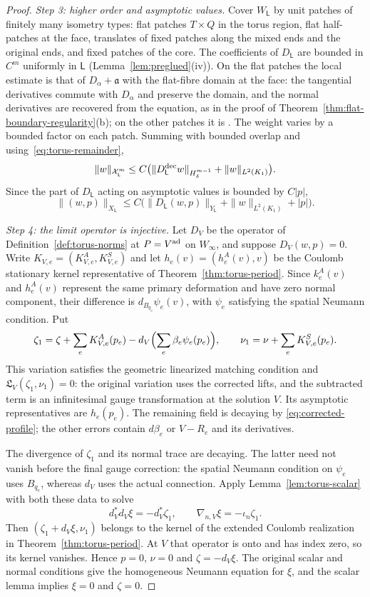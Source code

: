 \documentclass[11pt]{amsart}
\theoremstyle{definition}
\theoremstyle{remark}
\theoremstyle{plain}
\numberwithin{equation}{section}
\begin{document}
\begin{proof}
\emph{Step 3: higher order and asymptotic values.} Cover $W_\mathsf L$ by unit patches of finitely
many isometry types: flat patches $T\times Q$ in the torus region, flat half-patches at
the face, translates of fixed patches along the mixed ends and the original ends,
and fixed patches of the core. The coefficients of $D_\mathsf L$ are bounded in $C^m$
uniformly in $\mathsf L$ (Lemma~\ref{lem:preglued}(iv)). On the flat patches the local
estimate is that of $D_\alpha+\mathfrak a$ with the flat-fibre domain at the face: the
tangential derivatives commute with $D_\alpha$ and preserve the domain, and the
normal derivatives are recovered from the equation, as in the proof of
Theorem~\ref{thm:flat-boundary-regularity}(b); on the other patches it is
\cite[Theorem~4.17 and Remark~4.19]{DFL}. The weight varies by a bounded factor on
each patch. Summing with bounded overlap and using~\eqref{eq:torus-remainder},
\[
\|w\|_{\mathcal X^m_\mathsf L}\le C\bigl(\|D^{\rm dec}_{\mathsf L}w\|_{H^{m-1}_\delta}+\|w\|_{L^2(K_1)}\bigr).
\]
Since the part of $D_\mathsf L$ acting on asymptotic values is bounded by $C|p|$,
\begin{equation}\label{eq:torus-remainder-full}
\|(w,p)\|_{X_\mathsf L}\le C\bigl(\|D_{\mathsf L}(w,p)\|_{Y_\mathsf L}+\|w\|_{L^2(K_1)}+|p|\bigr).
\end{equation}

\emph{Step 4: the limit operator is injective.}
Let $D_V$ be the operator of Definition~\ref{def:torus-norms} at
$P=V^{\rm ad}$ on $W_\infty$, and suppose $D_V(w,p)=0$.
Write $K_{V,e}=(K^A_{V,e},K^S_{V,e})$ and let
$h_e(v)=(h_e^A(v),v)$ be the Coulomb stationary kernel
representative of Theorem~\ref{thm:torus-period}. Since $k_e^A(v)$
and $h_e^A(v)$ represent the same primary deformation and have
zero normal component, their difference is
$d_{B_{q_e}}\psi_e(v)$, with $\psi_e$ satisfying the spatial
Neumann condition. Put
\[
 \zeta_1=\zeta+\sum_eK^A_{V,e}(p_e)
             -d_V\Bigl(\sum_e\beta_e\psi_e(p_e)\Bigr),\qquad
 \nu_1=\nu+\sum_eK^S_{V,e}(p_e).
\]
This variation satisfies the geometric linearized matching condition
and $\mathfrak L_V(\zeta_1,\nu_1)=0$: the original variation
uses the corrected lifts, and the subtracted term is an
infinitesimal gauge transformation at the solution $V$.
Its asymptotic representatives are $h_e(p_e)$. The remaining field
is decaying by \eqref{eq:corrected-profile}; the other errors contain
$d\beta_e$ or $V-R_e$ and its derivatives.

The divergence of $\zeta_1$ and its normal trace are decaying.
The latter need not vanish before the final gauge correction:
the spatial Neumann condition on $\psi_e$ uses $B_{q_e}$,
whereas $d_V$ uses the actual connection. Apply
Lemma~\ref{lem:torus-scalar} with both these data to solve
\[
 d_V^*d_V\xi=-d_V^*\zeta_1,\qquad
 \nabla_{n,V}\xi=-\iota_n\zeta_1.
\]
Then $(\zeta_1+d_V\xi,\nu_1)$ belongs to the kernel of the
extended Coulomb realization in Theorem~\ref{thm:torus-period}.
At $V$ that operator is onto and has index zero, so its kernel
vanishes. Hence $p=0$, $\nu=0$ and $\zeta=-d_V\xi$.
The original scalar and normal conditions give the homogeneous
Neumann equation for $\xi$, and the scalar lemma implies
$\xi=0$ and $\zeta=0$.


\end{proof}
\end{document}
